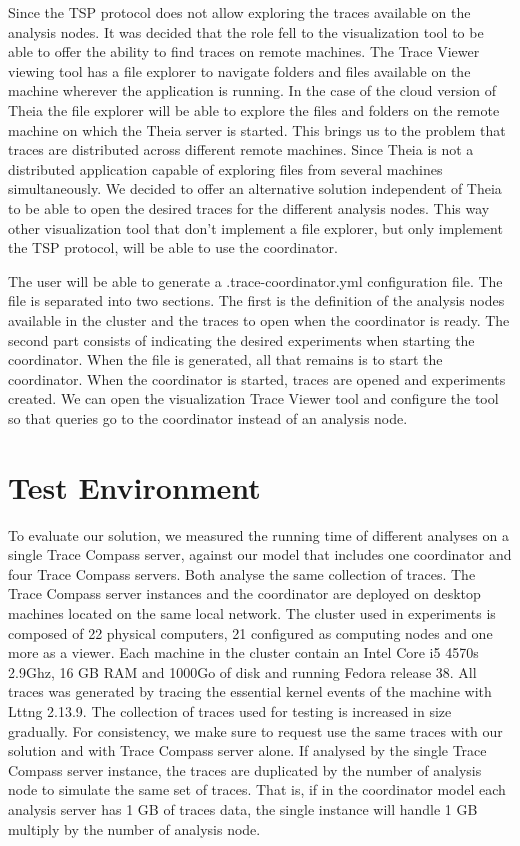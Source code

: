 Since the TSP protocol does not allow exploring the traces available on the analysis nodes. It was decided that the role fell to the visualization tool to be able to offer the ability to find traces on remote machines. The Trace Viewer viewing tool has a file explorer to navigate folders and files available on the machine wherever the application is running. In the case of the cloud version of Theia the file explorer will be able to explore the files and folders on the remote machine on which the Theia server is started. This brings us to the problem that traces are distributed across different remote machines. Since Theia is not a distributed application capable of exploring files from several machines simultaneously. We decided to offer an alternative solution independent of Theia to be able to open the desired traces for the different analysis nodes. This way other visualization tool that don't implement a file explorer, but only implement the TSP protocol, will be able to use the coordinator.

The user will be able to generate a .trace-coordinator.yml configuration file. The file is separated into two sections. The first is the definition of the analysis nodes available in the cluster and the traces to open when the coordinator is ready. The second part consists of indicating the desired experiments when starting the coordinator. When the file is generated, all that remains is to start the coordinator. When the coordinator is started, traces are opened and experiments created. We can open the visualization Trace Viewer tool and configure the tool so that queries go to the coordinator instead of an analysis node.

\section{Test Environment}

To evaluate our solution, we measured the running time of different analyses on a single Trace Compass server, against our model that includes one coordinator and four Trace Compass servers. Both analyse the same collection of traces. The Trace Compass server instances and the coordinator are deployed on desktop machines located on the same local network. The cluster used in experiments is composed of 22 physical computers, 21 configured as computing nodes and one more as a viewer. Each machine in the cluster contain an Intel Core i5 4570s 2.9Ghz, 16 GB RAM and 1000Go of disk and running Fedora release 38. All traces was generated by tracing the essential kernel events of the machine with Lttng 2.13.9. The collection of traces used for testing is increased in size gradually. For consistency, we make sure to request use the same traces with our solution and with Trace Compass server alone. If analysed by the single Trace Compass server instance, the traces are duplicated by the number of analysis node to simulate the same set of traces. That is, if in the coordinator model each analysis server has 1 GB of traces data, the single instance will handle 1 GB multiply by the number of analysis node.

